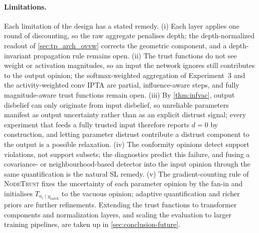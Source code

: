 \paragraph*{Limitations.} Each limitation of the design has a stated remedy.
(i) Each layer applies one round of discounting, so the raw aggregate penalises
depth; the depth-normalized readout of \cref{sec:tp_arch_ovvw} corrects the
geometric component, and a depth-invariant propagation rule remains open.
(ii) The trust functions do not see weight or activation magnitudes, so an input the
network ignores still contributes to the output opinion; the softmax-weighted
aggregation of Experiment~3 and the activity-weighted conv \ac{IPTA} are partial,
influence-aware steps, and fully magnitude-aware trust functions remain open.
(iii) By \cref{thm:infvac}, output disbelief can only originate from input
disbelief, so unreliable parameters manifest as output uncertainty rather than as
an explicit distrust signal; every experiment that feeds a fully trusted input
therefore reports $d = 0$ by construction, and letting parameter distrust
contribute a distrust component to the output is a possible relaxation.
(iv) The conformity opinions detect support violations, not support subsets; the
diagnostics predict this failure, and fusing a covariance- or neighbourhood-based
detector into the input opinion through the same quantification is the natural
\ac{SL} remedy. (v) The gradient-counting rule of \textsc{NodeTrust} fixes the
uncertainty of each parameter opinion by the fan-in and initialises
$T_{n_i \mid \overline{y_\text{batch}}}$ to the vacuous opinion; adaptive
quantification and richer priors are further refinements. Extending the trust
functions to transformer components and normalization layers, and scaling the
evaluation to larger training pipelines, are taken up in
\cref{sec:conclusion-future}.
